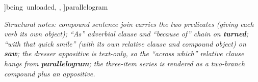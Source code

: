 \documentclass[12pt]{article}
\begin{document}
{{\begin{rkdiagram}
          ]{being~unloaded},
          ,
        ]{parallelogram}
      \end{rkdiagram}%
    }%
}

\bigskip

\noindent\textit{Structural notes: compound sentence join carries the
two predicates (giving each verb its own object); ``As'' adverbial
clause and ``because of'' chain on \textbf{turned}; ``with that quick
smile'' (with its own relative clause and compound object) on
\textbf{saw}; the dresser appositive is text-only, so the ``across
which'' relative clause hangs from \textbf{parallelogram}; the
three-item series is rendered as a two-branch compound plus an
appositive.}
\end{document}
